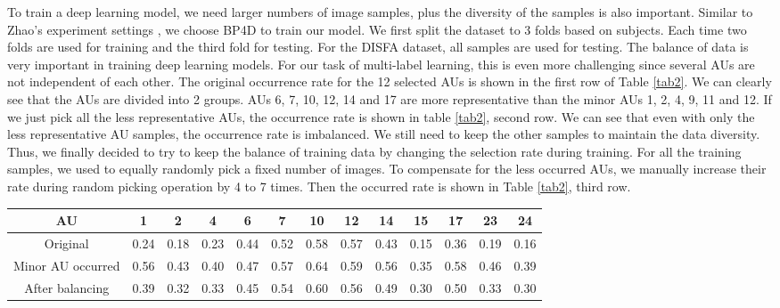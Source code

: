 \documentclass[a4paper, 10pt, conference]{ieeeconf}      %
\begin{document}
To train a deep learning model, we need larger numbers of image samples, plus the diversity of the samples is also important. Similar to Zhao's experiment settings \cite{p22}, we choose BP4D to train our model. We first split the dataset to 3 folds based on subjects. Each time two folds are used for training and the third fold for testing. For the DISFA dataset, all samples are used for testing.
The balance of data is very important in training deep learning models. For our task of multi-label learning, this is even more challenging since several AUs are not independent of each other. The original occurrence rate for the 12 selected AUs is shown in the first row of Table \ref{tab2}. We can clearly see that the AUs are divided into 2 groups. AUs 6, 7, 10, 12, 14 and 17 are more representative than the minor AUs 1, 2, 4, 9, 11 and 12. If we just pick all the less representative AUs, the occurrence rate is shown in table \ref{tab2}, second row.
We can see that even with only the less representative AU samples, the occurrence rate is imbalanced. We still need to keep the other samples to maintain the data diversity. Thus, we finally decided to try to keep the balance of training data by changing the selection rate during training. For all the training samples, we used to equally randomly pick a fixed number of images. To compensate for the less occurred AUs, we manually increase their rate during random picking operation by 4 to 7 times. Then the occurred rate is shown in Table \ref{tab2}, third row.

\begin{table*}
\caption{BP4D samples balancing for AU occurrence}
\label{tab2}
\begin{center}
\begin{tabular}{|c|c|c|c|c|c|c|c|c|c|c|c|c|}
\hline
AU & 1 & 2 & 4 & 6 & 7 & 10 & 12 & 14 & 15 & 17 & 23 & 24\\
\hline
Original & 0.24 & 0.18 & 0.23 & 0.44 & 0.52 & 0.58 & 0.57 & 0.43 & 0.15 & 0.36 & 0.19 & 0.16\\
Minor AU occurred & 0.56 & 0.43 & 0.40 & 0.47 & 0.57 & 0.64 & 0.59 & 0.56 & 0.35 & 0.58 & 0.46 & 0.39\\
After balancing & 0.39 & 0.32 & 0.33 & 0.45 & 0.54 & 0.60 & 0.56 & 0.49 & 0.30 & 0.50 & 0.33 & 0.30\\
\hline
\end{tabular}
\end{center}
\end{table*}

\end{document}
